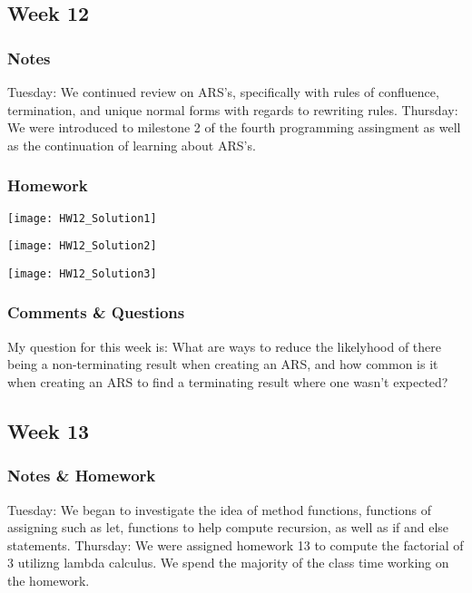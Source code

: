 \documentclass{article}
\theoremstyle{theorem}
\theoremstyle{definition}
\theoremstyle{remark}
\begin{document}
  \subsection{Week 12}

  \subsubsection{Notes}
  Tuesday: We continued review on ARS's, specifically with rules of confluence, termination, and unique normal forms with regards to rewriting rules.
  \newline
  Thursday: We were introduced to milestone 2 of the fourth programming assingment as well as the continuation of learning about ARS's.

  \subsubsection{Homework}
  \graphicspath{ {C:/Users/jrmul/OneDrive/Documents/CPSC_Courses/CPSC_354/images/} }
  \begin{center} \texttt{[image: HW12\_Solution1]} \end{center}
  \begin{center} \texttt{[image: HW12\_Solution2]} \end{center}
  \begin{center} \texttt{[image: HW12\_Solution3]} \end{center}

  \subsubsection{Comments \& Questions}
  My question for this week is: What are ways to reduce the likelyhood of there being a non-terminating result when creating an ARS, and how common is it when creating an ARS to find a terminating result where one wasn't expected? 

  \subsection{Week 13}
  \subsubsection{Notes \& Homework}

  Tuesday: We began to investigate the idea of method functions, functions of assigning such as let, functions to help compute recursion, as well as if and else statements.
  \newline
  Thursday: We were assigned homework 13 to compute the factorial of 3 utilizng lambda calculus. We spend the majority of the class time working on the homework.
\end{document}
